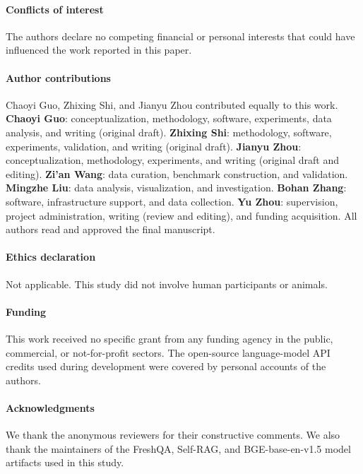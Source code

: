 \documentclass[pdflatex,sn-basic]{sn-jnl}
\begin{document}
\paragraph*{Conflicts of interest}
The authors declare no competing financial or personal interests that could have influenced the work reported in this paper.

\paragraph*{Author contributions}
Chaoyi Guo, Zhixing Shi, and Jianyu Zhou contributed equally to this work.
\textbf{Chaoyi Guo}: conceptualization, methodology, software, experiments, data analysis, and writing (original draft).
\textbf{Zhixing Shi}: methodology, software, experiments, validation, and writing (original draft).
\textbf{Jianyu Zhou}: conceptualization, methodology, experiments, and writing (original draft and editing).
\textbf{Zi'an Wang}: data curation, benchmark construction, and validation.
\textbf{Mingzhe Liu}: data analysis, visualization, and investigation.
\textbf{Bohan Zhang}: software, infrastructure support, and data collection.
\textbf{Yu Zhou}: supervision, project administration, writing (review and editing), and funding acquisition.
All authors read and approved the final manuscript.

\paragraph*{Ethics declaration}
Not applicable. This study did not involve human participants or animals.

\paragraph*{Funding}
This work received no specific grant from any funding agency in the public, commercial, or not-for-profit sectors. The open-source language-model API credits used during development were covered by personal accounts of the authors.

\paragraph*{Acknowledgments}
We thank the anonymous reviewers for their constructive comments. We also thank the maintainers of the FreshQA, Self-RAG, and BGE-base-en-v1.5 model artifacts used in this study.


\end{document}
